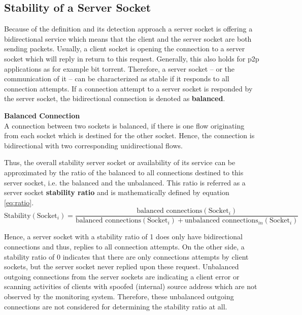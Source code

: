 \subsection{Stability of a Server Socket} Because of the definition and its 
detection approach a \gls{server socket} is offering a bidirectional service 
which means that the client and the \gls{server socket} are both sending 
packets. Usually, a client socket is opening the connection to a \gls{server 
socket} which will reply in return to this request. Generally, this also holds 
for \gls{p2p} applications as for example bit torrent. Therefore, a 
\gls{server socket} -- or the communication of it -- can be characterized as 
stable if it responds to all connection attempts. If a connection attempt to a \gls{server socket} is responded by the \gls{server socket}, the bidirectional connection is denoted as \textbf{balanced}. 

\parbox{ 
\textwidth}{ 
\begin{defn}
	{\textbf{Balanced Connection}\\} A connection between two sockets is balanced, if there is one flow originating from each socket which is destined for the other socket. Hence, the connection is bidirectional with two corresponding unidirectional flows. 
\end{defn}
}

Thus, the overall stability \gls{server socket} or availability of its service 
can be approximated by the ratio of the balanced to all connections destined to 
this \gls{server socket}, i.e. the balanced and the unbalanced. This ratio is 
referred as a \gls{server socket} \textbf{stability ratio} and is mathematically 
defined by equation \ref{eq:ratio}. 
\begin{equation}
	\text{Stability}(\text{Socket}_i) = \frac{\text{balanced connections}(\text{Socket}_i)}{\text{balanced connections}(\text{Socket}_i) + \text{unbalanced connections}_{in}(\text{Socket}_i)} 
	\label{eq:ratio} 
\end{equation}

Hence, a \gls{server socket} with a stability ratio of 1 does only have 
bidirectional connections and thus, replies to all connection attempts. On the 
other side, a stability ratio of 0 indicates that there are only connections 
attempts by client sockets, but the \gls{server socket} never replied upon these 
request. Unbalanced outgoing connections from the \glspl{server socket} are 
indicating a client error or scanning activities of clients with spoofed 
(internal) source address which are not observed by the monitoring system. 
Therefore, these unbalanced outgoing connections are not considered for 
determining the stability ratio at all.

